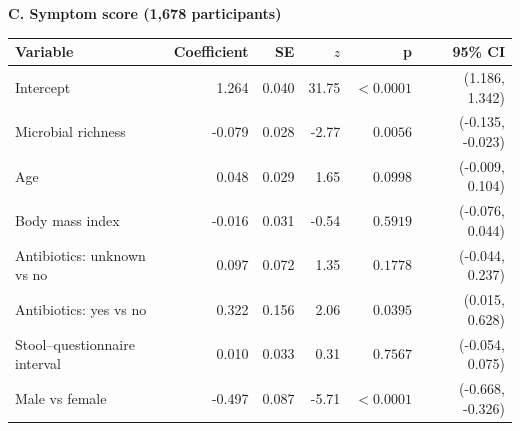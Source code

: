 \par\medskip
\textbf{C. Symptom score (1,678 participants)}
\par\smallskip
\begin{tabular}{p{5.5cm}rrrrr}
\toprule
Variable & Coefficient & SE & $z$ & p & 95\% CI \\
\midrule
Intercept & 1.264 & 0.040 & 31.75 & $<0.0001$ & (1.186, 1.342) \\
Microbial richness & -0.079 & 0.028 & -2.77 & $0.0056$ & (-0.135, -0.023) \\
Age & 0.048 & 0.029 & 1.65 & $0.0998$ & (-0.009, 0.104) \\
Body mass index & -0.016 & 0.031 & -0.54 & $0.5919$ & (-0.076, 0.044) \\
Antibiotics: unknown vs no & 0.097 & 0.072 & 1.35 & $0.1778$ & (-0.044, 0.237) \\
Antibiotics: yes vs no & 0.322 & 0.156 & 2.06 & $0.0395$ & (0.015, 0.628) \\
Stool--questionnaire interval & 0.010 & 0.033 & 0.31 & $0.7567$ & (-0.054, 0.075) \\
Male vs female & -0.497 & 0.087 & -5.71 & $<0.0001$ & (-0.668, -0.326) \\
\bottomrule
\end{tabular}
\par\medskip
